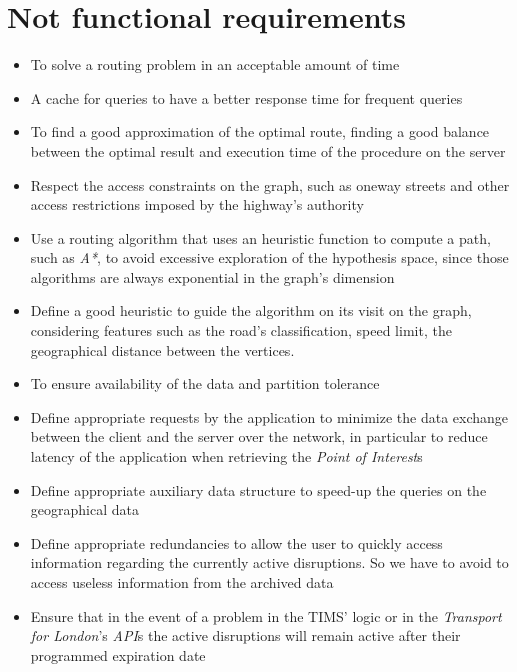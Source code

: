 \chapter{Not functional requirements}

\begin{itemize}
	\item To solve a routing problem in an acceptable amount of time
	
	\item A cache for queries to have a better response time for frequent 
	queries
	
	\item To find a good approximation of the optimal route, finding a good 
	balance between the optimal result and execution time of the procedure on 
	the server
	
	\item Respect the access constraints on the graph, such as oneway streets 
	and other access restrictions imposed by the highway's authority
	
	\item Use a routing algorithm that uses an heuristic function to compute a 
	path, such as \textit{A*}, to avoid excessive exploration of the hypothesis 
	space, 
	since those algorithms are always exponential in the graph's dimension
	
	\item Define a good heuristic to guide the algorithm on its visit on the 
	graph, considering features such as the road's classification, speed limit, 
	the geographical distance between the vertices.
	
	\item To ensure availability of the data and partition tolerance
	
	\item Define appropriate requests by the application to minimize the data 
	exchange between the client and the server over the network, in particular 
	to reduce latency of the application when retrieving the \textit{Point of 
	Interest}s
	
	\item Define appropriate auxiliary data structure to speed-up the queries 
	on the geographical data

	\item Define appropriate redundancies to allow the user to quickly access 
	information regarding the currently active disruptions. So we have to avoid 
	to access useless information from the archived data
	
	\item Ensure that in the event of a problem in the TIMS' logic or in the 
	\textit{Transport for London}'s \textit{API}s the active 
	disruptions will remain active after their programmed expiration date
\end{itemize}